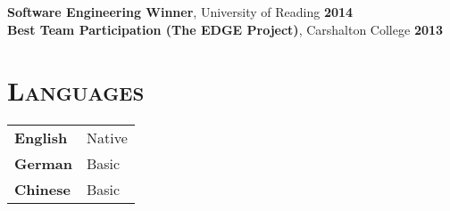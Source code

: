 \documentclass[line, margin, 10pt]{res}
\begin{document}
\begin{resume}
{\bf Software Engineering Winner}, University of Reading {\bf \hfill 2014}\\
{\bf Best Team Participation (The EDGE Project)}, Carshalton College {\bf \hfill 2013}

\section{\textsc{Languages}}

\begin{tabular}[t]{@{} p{1.2in} p{3.75in} @{}}

\textbf{English} & Native\\ 
\textbf{German} & Basic \\
\textbf{Chinese} & Basic

\end{tabular}

\end{resume}
\end{document}
